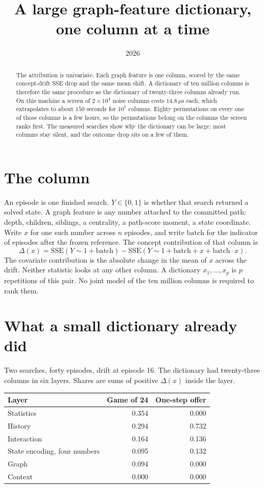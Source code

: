 \documentclass[11pt,a4paper]{article}
\title{A large graph-feature dictionary,\\
one column at a time}
\author{}
\date{2026}
\begin{document}
\maketitle

\begin{abstract}
The attribution is univariate.
Each graph feature is one column, scored by the same concept-drift SSE drop and the same mean shift.
A dictionary of ten million columns is therefore the same procedure as the dictionary of twenty-three columns already run.
On this machine a screen of \(2\times 10^{4}\) noise columns costs \(14.8\,\mu\mathrm{s}\) each, which extrapolates to about \(150\) seconds for \(10^{7}\) columns.
Eighty permutations on every one of those columns is a few hours, so the permutations belong on the columns the screen ranks first.
The measured searches show why the dictionary can be large: most columns stay silent, and the outcome drop sits on a few of them.
\end{abstract}

\section{The column}
An episode is one finished search.
\(Y\in\{0,1\}\) is whether that search returned a solved state.
A graph feature is any number attached to the committed path: depth, children, siblings, a centrality, a path-score moment, a state coordinate.
Write \(x\) for one such number across \(n\) episodes, and write \(\mathrm{batch}\) for the indicator of episodes after the frozen reference.
The concept contribution of that column is
\[
\Delta(x)
=
\mathrm{SSE}(Y\sim 1+\mathrm{batch})
-
\mathrm{SSE}(Y\sim 1+\mathrm{batch}+x+\mathrm{batch}\cdot x).
\]
The covariate contribution is the absolute change in the mean of \(x\) across the drift.
Neither statistic looks at any other column.
A dictionary \(x_1,\ldots,x_p\) is \(p\) repetitions of this pair.
No joint model of the ten million columns is required to rank them.

\section{What a small dictionary already did}
Two searches, forty episodes, drift at episode 16.
The dictionary had twenty-three columns in six layers.
Shares are sums of positive \(\Delta(x)\) inside the layer.

\begin{center}
\begin{tabular}{lrr}
\toprule
Layer & Game of 24 & One-step offer \\
\midrule
Statistics & 0.354 & 0.000 \\
History & 0.294 & 0.732 \\
Interaction & 0.164 & 0.136 \\
State encoding, four numbers & 0.095 & 0.132 \\
Graph & 0.094 & 0.000 \\
Context & 0.000 & 0.000 \\
\bottomrule
\end{tabular}
\end{center}
\end{document}
